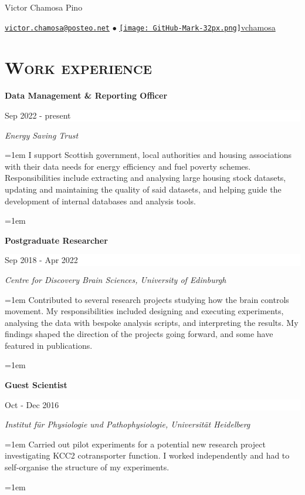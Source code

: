 \documentclass[paper=a4,fontsize=11pt]{scrartcl}
\newcommand{\sepspace}{\vspace*{1em}}
\newcommand{\MyName}[1]{ %
		\Huge \usefont{OT1}{phv}{b}{n} \hfill #1
		\par \normalsize \normalfont}
\newcommand{\Contactdetails}[1]{ %
		\normalsize  \usefont{OT1}{phv}{m}{n}\hfill #1
		\par \small \normalfont}
\newcommand{\NewPart}[1]{\section*{\textsc{#1}}} %
\newcommand{\ExperienceEntry}[5]{ %
		\noindent \textbf{#1} \hfill %
		\colorbox{White}{
            \parbox{9em}{
			\hfill\color{Black}#2}} \par %
		\noindent \textit{#3} \par %
		\noindent\hangindent=1em\hangafter=0 \small #4 %
		\normalsize \par
		\hangindent=1em\hangafter=1 \small #5 \par} %
\begin{document}
\MyName{Victor Chamosa Pino}
\sepspace
\Contactdetails{\href{mailto:victor.chamosa@posteo.net}{\texttt{victor.chamosa@posteo.net}} \thinspace$\bullet$ \thinspace \href{https://github.com/vchamosa}{\texttt{[image: GitHub-Mark-32px.png]}\small{vchamosa}}} %


\sepspace
\noindent


\NewPart{Work experience}

\ExperienceEntry{Data Management \& Reporting Officer}{Sep 2022  - present}{Energy Saving Trust}{I support Scottish government, local authorities and housing associations with their data needs for energy efficiency and fuel poverty schemes. Responsibilities include extracting and analysing large housing stock datasets, updating and maintaining the quality of said datasets, and helping guide the development of internal databases and analysis tools.}{}
\sepspace

\ExperienceEntry{Postgraduate Researcher}{Sep 2018 - Apr 2022}{Centre for Discovery Brain Sciences, University of Edinburgh}{Contributed to several research projects studying how the brain controls movement. My responsibilities included designing and executing experiments, analysing the data with bespoke analysis scripts, and interpreting the results. My findings shaped the direction of the projects going forward, and some have featured in publications.}{}
\sepspace %

\ExperienceEntry{Guest Scientist}{Oct - Dec 2016}{Institut für Physiologie und Pathophysiologie, Universität Heidelberg}{Carried out pilot experiments for a potential new research project investigating KCC2 cotransporter function. I worked independently and had to self-organise the structure of my experiments.}{}
\sepspace
\end{document}
